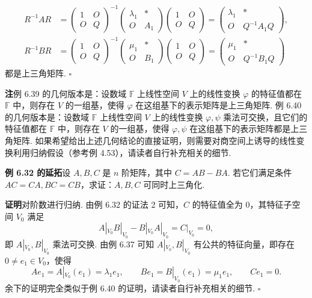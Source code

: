 \documentclass[UTF8,12pt,a4paper,fontset=fandol]{ctexart}
\begin{document}
\[
\begin{aligned}
R^{-1}AR
&=\left(\begin{array}{cc}
1 & O\\
O & Q
\end{array}\right)^{-1}
\left(\begin{array}{cc}
\lambda_1 & *\\
O & A_1
\end{array}\right)
\left(\begin{array}{cc}
1 & O\\
O & Q
\end{array}\right)
=\left(\begin{array}{cc}
\lambda_1 & *\\
O & Q^{-1}A_1Q
\end{array}\right),\\
R^{-1}BR
&=\left(\begin{array}{cc}
1 & O\\
O & Q
\end{array}\right)^{-1}
\left(\begin{array}{cc}
\mu_1 & *\\
O & B_1
\end{array}\right)
\left(\begin{array}{cc}
1 & O\\
O & Q
\end{array}\right)
=\left(\begin{array}{cc}
\mu_1 & *\\
O & Q^{-1}B_1Q
\end{array}\right)
\end{aligned}
\]
都是上三角矩阵. $\square$

\noindent\textbf{注}\quad 例 6.39 的几何版本是：设数域 $\mathbb{F}$ 上线性空间 $V$ 上的线性变换 $\varphi$ 的特征值都在 $\mathbb{F}$ 中，则存在 $V$ 的一组基，使得 $\varphi$ 在这组基下的表示矩阵是上三角矩阵. 例 6.40 的几何版本是：设数域 $\mathbb{F}$ 上线性空间 $V$ 上的线性变换 $\varphi,\psi$ 乘法可交换，且它们的特征值都在 $\mathbb{F}$ 中，则存在 $V$ 的一组基，使得 $\varphi,\psi$ 在这组基下的表示矩阵都是上三角矩阵. 如果希望给出上述几何结论的直接证明，则需要对商空间上诱导的线性变换利用归纳假设（参考例 4.53），请读者自行补充相关的细节.

\noindent\textbf{例 6.32 的延拓}\quad 设 $A,B,C$ 是 $n$ 阶矩阵，其中 $C=AB-BA$. 若它们满足条件 $AC=CA,BC=CB$，求证：$A,B,C$ 可同时上三角化.

\noindent\textbf{证明}\quad 对阶数进行归纳. 由例 6.32 的证法 2 可知，$C$ 的特征值全为 $0$，其特征子空间 $V_0$ 满足
\[
A|_{V_0}B|_{V_0}-B|_{V_0}A|_{V_0}=C|_{V_0}=0,
\]
即 $A|_{V_0},B|_{V_0}$ 乘法可交换. 由例 6.37 可知 $A|_{V_0},B|_{V_0}$ 有公共的特征向量，即存在 $0\ne e_1\in V_0$，使得
\[
Ae_1=A|_{V_0}(e_1)=\lambda_1e_1,\qquad
Be_1=B|_{V_0}(e_1)=\mu_1e_1,\qquad
Ce_1=0.
\]
余下的证明完全类似于例 6.40 的证明，请读者自行补充相关的细节. $\square$
\end{document}
